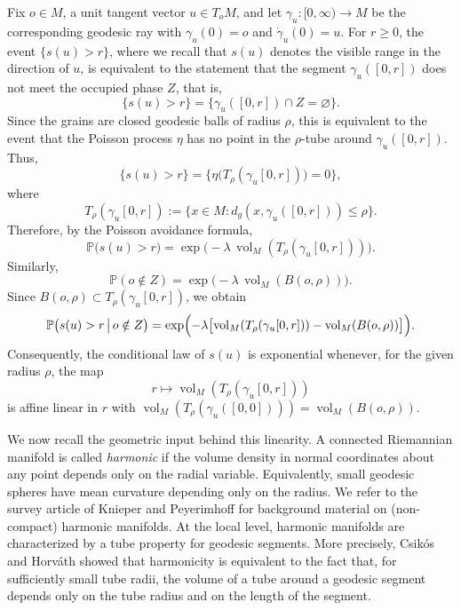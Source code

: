 \documentclass[11pt,a4paper]{article}
\theoremstyle{plain}
\theoremstyle{definition}
\theoremstyle{remark}
\newcommand{\vol}{\mathop{\mathrm{vol}}\nolimits}
\def\PP{\mathbb{P}}
\begin{document}
Fix \(o\in M\), a unit tangent vector \(u\in T_oM\), and let
\(\gamma_u:[0,\infty)\to M\) be the corresponding geodesic ray with
\(\gamma_u(0)=o\) and \(\dot\gamma_u(0)=u\). For \(r\geq 0\), the event
\(\{s(u)>r\}\), where we recall that $s(u)$ denotes the visible range in the direction of $u$, is equivalent to the statement that the segment
\(\gamma_u([0,r])\) does not meet the occupied phase $Z$, that is,
\[
\{s(u)>r\}
=
\bigl\{\gamma_u([0,r])\cap Z=\varnothing\bigr\}.
\]
Since the grains are closed geodesic balls of radius \(\rho\), this is
equivalent to the event that the Poisson process \(\eta\) has no point in the
\(\rho\)-tube around \(\gamma_u([0,r])\). Thus,
\[
\{s(u)>r\}
=
\bigl\{\eta\bigl(T_\rho(\gamma_u[0,r])\bigr)=0\bigr\},
\]
where
\[
T_\rho(\gamma_u[0,r])
:=
\{x\in M:d_g(x,\gamma_u([0,r]))\leq \rho\}.
\]
Therefore, by the Poisson avoidance formula,
\[
\PP\bigl(s(u)>r\bigr)
=
\exp\bigl(-\lambda\,\vol_M(T_\rho(\gamma_u[0,r]))\bigr).
\]
Similarly,
\[
\PP(o\notin Z)
=
\exp\bigl(-\lambda\,\vol_M(B(o,\rho))\bigr).
\]
Since \(B(o,\rho)\subset T_\rho(\gamma_u[0,r])\), we obtain
\begin{equation}\label{eq:Probtube}
	\PP\bigl(s(u)>r\,\big|\,o\notin Z\bigr)
	=
	\exp\Bigl(
	-\lambda\bigl[
	\vol_M(T_\rho(\gamma_u[0,r]))
	-
	\vol_M(B(o,\rho))
	\bigr]
	\Bigr).
\end{equation}
Consequently, the conditional law of \(s(u)\) is exponential whenever, for the
given radius \(\rho\), the map
\[
r\longmapsto \vol_M(T_\rho(\gamma_u[0,r]))
\]
is affine linear in \(r\) with $\vol_M(T_\rho(\gamma_u([0,0])))=\vol_M(B(o,\rho))$.

We now recall the geometric input behind this linearity. A connected
Riemannian manifold is called \emph{harmonic} if the volume density in normal
coordinates about any point depends only on the radial variable. Equivalently,
small geodesic spheres have mean curvature depending only on the radius. We
refer to the survey article of Knieper and Peyerimhoff \cite{KnieperSurvey}
for background material on (non-compact) harmonic manifolds. At the local level, harmonic manifolds are characterized by a tube property for
geodesic segments. More precisely, Csikós and Horváth
\cite[Theorem 3]{CsikosHorvathHarmonicTubes} showed that harmonicity is equivalent to the
fact that, for sufficiently small tube radii, the volume of a tube around a
geodesic segment depends only on the tube radius and on the length of the
segment.
\end{document}

